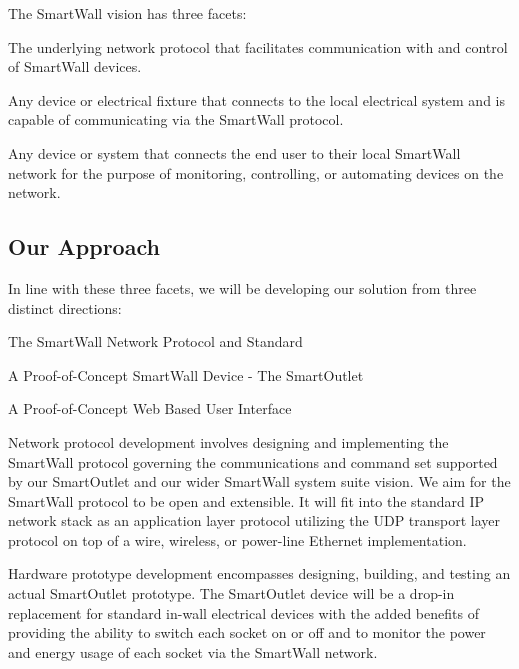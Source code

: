 \documentclass[12pt]{article}
\begin{document}
The SmartWall vision has three facets:
\begin{description}
  \setlength{\itemsep}{0pt}
  \setlength{\parskip}{0pt}
  \setlength{\parsep}{0pt}
\item[SmartWall Protocol:] The underlying network protocol that
  facilitates communication with and control of SmartWall devices.
\item[SmartWall Enabled Devices:] Any device or electrical fixture that
  connects to the local electrical system and is capable of
  communicating via the SmartWall protocol.
\item[SmartWall User Interfaces:] Any device or system that connects
  the end user to their local SmartWall network for the purpose of
  monitoring, controlling, or automating devices on the network.
\end{description}

\subsection{Our Approach}
In line with these three facets, we will be  developing our solution
from three distinct directions:
\begin{description}
  \setlength{\itemsep}{0pt}
  \setlength{\parskip}{0pt}
  \setlength{\parsep}{0pt}
\item[Network:] The SmartWall Network Protocol and Standard
\item[Hardware:] A Proof-of-Concept SmartWall Device - The SmartOutlet
\item[User Interface:] A Proof-of-Concept Web Based User Interface 
\end{description}

Network protocol development involves designing and implementing the
SmartWall protocol governing the communications and command set supported
by our SmartOutlet and our wider SmartWall system suite
vision. We aim for the SmartWall protocol to be open and
extensible. It will fit into the standard IP network stack as an application
layer protocol utilizing the UDP transport layer protocol on top of a
wire, wireless, or power-line Ethernet implementation.

Hardware prototype development encompasses designing,
building, and testing an actual SmartOutlet prototype. The SmartOutlet
device will be a drop-in replacement for standard in-wall electrical
devices with the added benefits of providing the ability to switch
each socket on or off and
to monitor the power and energy usage of each socket via the SmartWall
network.
\end{document}
